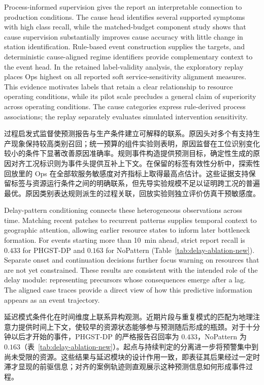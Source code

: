\documentclass[a4paper,fleqn]{cas-dc}
\newcommand{\zhpara}[1]{%
  \par\begingroup\small\color{black!72}\noindent #1\par\endgroup}
\begin{document}
Process-informed supervision gives the report an interpretable connection to production conditions. The cause head identifies several supported symptoms with high class recall, while the matched-budget component study shows that cause supervision substantially improves cause accuracy with little change in station identification. Rule-based event construction supplies the targets, and deterministic cause-aligned regime identifiers provide complementary context to the event head. In the retained label-validity analysis, the exploratory replay places Ops highest on all reported soft service-sensitivity alignment measures. This evidence motivates labels that retain a clear relationship to resource operating conditions, while its pilot scale precludes a general claim of superiority across operating conditions. The cause categories express rule-derived process associations; the replay separately evaluates simulated intervention sensitivity.

\zhpara{过程启发式监督使预测报告与生产条件建立可解释的联系。原因头对多个有支持生产现象保持较高类别召回；统一预算的组件实验则表明，原因监督在工位识别变化较小的条件下显著改善原因准确率。规则事件构造提供预测目标，确定性生成的原因对齐工况标识则为事件头提供互补上下文。在保留的标签有效性分析中，探索性回放里的 Ops 在全部软服务敏感度对齐指标上取得最高点估计。这些证据支持保留标签与资源运行条件之间的明确联系，但先导实验规模不足以证明跨工况的普遍最优。原因类别表达规则派生的过程关联，回放实验则独立评价仿真干预敏感度。}

Delay-pattern conditioning connects these heterogeneous observations across time. Matching recent patches to recurrent patterns supplies temporal context to geographic attention, allowing earlier resource states to inform later bottleneck formation. For events starting more than 10~min ahead, strict report recall is $0.433$ for PHGST-DP and $0.163$ for NoPattern (Table~\ref{tab:delay-ablation-new}). Separate onset and continuation decisions further focus warning on resources that are not yet constrained. These results are consistent with the intended role of the delay module: representing precursors whose consequences emerge after a lag. The aligned case traces provide a direct view of how this predictive information appears as an event trajectory.

\zhpara{延迟模式条件化在时间维度上联系异构观测。近期片段与重复模式的匹配为地理注意力提供时间上下文，使较早的资源状态能够参与预测随后形成的瓶颈。对于十分钟以后才开始的事件，PHGST-DP 的严格报告召回率为 $0.433$，NoPattern 为 $0.163$（表~\ref{tab:delay-ablation-new}）。起点与持续判定的分离进一步将预警集中到尚未受限的资源。这些结果与延迟模块的设计作用一致，即表征其后果经过一定时滞才显现的前驱信息；对齐的案例轨迹则直观展示这种预测信息如何形成事件过程。}
\end{document}
